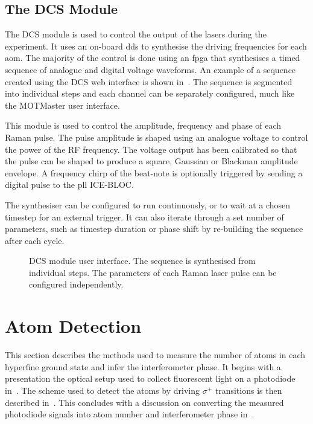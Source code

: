 \subsection{The DCS Module}\label{subsec:dcs_module} 
The DCS module is used to control the
output of the lasers during the experiment. It uses an on-board
\ac{dds} to
synthesise the  driving frequencies for each \ac{aom}.
The majority of the control is done using an \ac{fpga} that synthesises a timed
sequence of analogue and digital voltage waveforms. An example of a sequence
created using the DCS web interface is shown in~. The
sequence is segmented into individual steps and each channel can be separately
configured, much like the MOTMaster user interface. \par\noindent This module is
used to control the amplitude, frequency and phase of each Raman pulse. The
pulse amplitude is shaped using an analogue voltage to control the power of the
RF frequency. The voltage output has been calibrated so that the pulse can be shaped to
produce a square, Gaussian or Blackman amplitude envelope. A frequency
chirp of the beat-note is
optionally triggered by sending a digital pulse to the \ac{pll} ICE-BLOC.
\par\noindent The synthesiser can be configured to run continuously, or to wait
at a chosen timestep for an external trigger. It can also iterate through a set
number of parameters, such as timestep duration or phase shift by re-building
the sequence after each cycle.  
\begin{sidewaysfigure}[!htbp] 
  \centering
	\caption[DCS Module User interface]{DCS module user interface. The sequence is
		synthesised from individual steps. The parameters of each Raman laser pulse
		can be configured independently.} 
  \label{fig:dcs_module} 
\end{sidewaysfigure}
\section{Atom Detection}\label{sec:atom_detection} 
This section describes the methods used to
measure the number of atoms in each hyperfine ground state and infer
the interferometer phase. It begins with a
presentation the optical setup used to collect fluorescent light on a
photodiode in~.
The scheme used to detect the atoms by
driving \(\sigma^+\) transitions is then described in~.
This concludes with a
discussion on converting the measured photodiode signals into atom
number and interferometer phase
in~.
